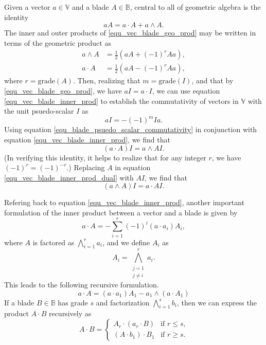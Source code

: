 \documentclass{birkjour}
\theoremstyle{definition}
\theoremstyle{remark}
\numberwithin{equation}{section}
\newcommand{\B}{\mathbb{B}}
\newcommand{\V}{\mathbb{V}}
\newcommand{\grade}{\mbox{grade}}
\begin{document}
Given a vector $a\in\V$ and a blade $A\in\B$, central to all of geometric algebra is the identity
\begin{equation}\label{equ_vec_blade_geo_prod}
aA = a\cdot A + a\wedge A.
\end{equation}
The inner and outer products of \eqref{equ_vec_blade_geo_prod} may be written in terms
of the geometric product as
\begin{align}
a\wedge A &= \frac{1}{2}\left(aA + (-1)^rAa\right),\label{equ_vec_blade_outer_prod} \\
a\cdot A &= \frac{1}{2}\left(aA - (-1)^rAa\right),\label{equ_vec_blade_inner_prod}
\end{align}
where $r=\grade(A)$.  Then, realizing that $m=\grade(I)$, and that by \eqref{equ_vec_blade_geo_prod},
we have $aI=a\cdot I$, we can use equation \eqref{equ_vec_blade_inner_prod} to establish the
commutativity of vectors in $\V$ with the unit psuedo-scalar $I$ as
\begin{equation}\label{equ_blade_psuedo_scalar_commutativity}
aI = -(-1)^mIa.
\end{equation}
Using equation \eqref{equ_blade_psuedo_scalar_commutativity} in conjunction with equation \eqref{equ_vec_blade_inner_prod},
we find that
\begin{equation}\label{equ_vec_blade_inner_prod_dual}
(a\cdot A)I=a\wedge AI.
\end{equation}
(In verifying this identity, it helps to realize that for any integer $r$, we have $(-1)^r=(-1)^{-r}$.)
Replacing $A$ in equation \eqref{equ_vec_blade_inner_prod_dual} with $AI$, we find that
\begin{equation}\label{equ_vec_blade_outer_prod_dual}
(a\wedge A)I=a\cdot AI.
\end{equation}

Refering back to equation \eqref{equ_vec_blade_inner_prod}, another important formulation of the inner product between a vector and a blade
is given by
\begin{equation}\label{equ_vec_blade_inner_prod_series}
a\cdot A=-\sum_{i=1}^r(-1)^i(a\cdot a_i)A_i,
\end{equation}
where $A$ is factored as $\bigwedge_{i=1}^r a_i$, and we define $A_i$ as
\begin{equation}\label{equ_A_i}
A_i=\bigwedge_{\substack{j=1\\j\neq i}}^r a_i.
\end{equation}
This leads to the following recursive formulation.
\begin{equation}
a\cdot A = (a\cdot a_1)A_1-a_1\wedge(a\cdot A_1)
\end{equation}
If a blade $B\in\B$ has grade $s$ and factorization $\bigwedge_{i=1}^s b_i$, then we can express
the product $A\cdot B$ recursively as
\begin{equation}
A\cdot B = \left\{\begin{array}{ll}
A_r\cdot(a_r\cdot B) & \mbox{if $r\leq s$,} \\
(A\cdot b_1)\cdot B_1 & \mbox{if $r\geq s$.}
\end{array}\right.
\end{equation}
\end{document}
